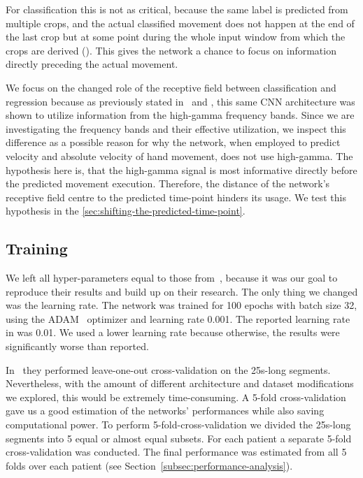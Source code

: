 For classification this is not as critical, because the same label is predicted from multiple crops, and the actual classified movement does not happen at the end of the last crop but at some point during the whole input window from which the crops are derived (\cite{schirrmeister-deep-2017}).
This gives the network a chance to focus on information directly preceding the actual movement.

We focus on the changed role of the receptive field between classification and regression because as previously stated in~\cite{schirrmeister-deep-2017} and \cite{hartmann-hierarchical-2018}, this same CNN architecture was shown to utilize information from the high-gamma frequency bands.
Since we are investigating the frequency bands and their effective utilization, we inspect this difference as a possible reason for why the network, when employed to predict velocity and absolute velocity of hand movement, does not use high-gamma.
The hypothesis here is, that the high-gamma signal is most informative directly before the predicted movement execution.
Therefore, the distance of the network's receptive field centre to the predicted time-point hinders its usage.
We test this hypothesis in the \cref{sec:shifting-the-predicted-time-point}.

\subsection{Training}\label{subsec:training}
We left all hyper-parameters equal to those from~\cite{Hammer-2021}, because it was our goal to reproduce their results and build up on their research.
The only thing we changed was the learning rate.
The network was trained for 100 epochs with batch size 32, using the ADAM~ optimizer and learning rate 0.001.
The reported learning rate in \cite{Hammer-2021} was 0.01.
We used a lower learning rate because otherwise, the results were significantly worse than reported.

In~\cite{Hammer-2021} they performed leave-one-out cross-validation on the 25s-long segments.
Nevertheless, with the amount of different architecture and dataset modifications we explored, this would be extremely time-consuming.
A 5-fold cross-validation gave us a good estimation of the networks' performances while also saving computational power. 
To perform 5-fold-cross-validation we divided the 25s-long segments into 5 equal or almost equal subsets.
For each patient a separate 5-fold cross-validation was conducted.
The final performance was estimated from all 5 folds over each patient (see Section~\ref{subsec:performance-analysis}).


